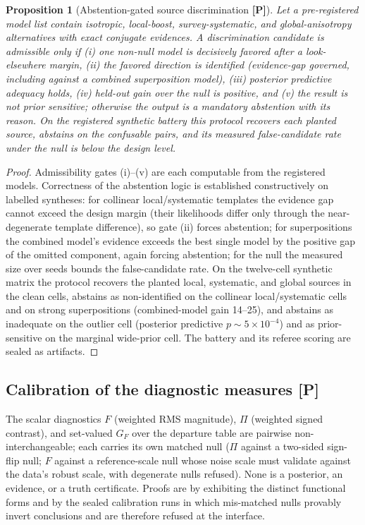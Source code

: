 \documentclass[10pt]{article}
\newtheorem{proposition}[theorem]{Proposition}
\theoremstyle{definition}
\newcommand{\tier}[1]{\textbf{[#1]}}
\begin{document}
\begin{proposition}[Abstention-gated source discrimination \tier{P}]
\label{prop:mix}
Let a pre-registered model list contain isotropic, local-boost,
survey-systematic, and global-anisotropy alternatives with exact
conjugate evidences. A discrimination candidate is admissible only if
(i) one non-null model is decisively favored after a look-elsewhere
margin, (ii) the favored direction is identified (evidence-gap
governed, including against a combined superposition model),
(iii) posterior predictive adequacy holds, (iv) held-out gain over the
null is positive, and (v) the result is not prior sensitive; otherwise
the output is a mandatory abstention with its reason. On the
registered synthetic battery this protocol recovers each planted
source, abstains on the confusable pairs, and its measured false-candidate
rate under the null is below the design level.
\end{proposition}
\begin{proof}
Admissibility gates (i)--(v) are each computable from the registered
models. Correctness of the abstention logic is established
constructively on labelled syntheses: for collinear local/systematic
templates the evidence gap cannot exceed the design margin (their
likelihoods differ only through the near-degenerate template
difference), so gate (ii) forces abstention; for superpositions the
combined model's evidence exceeds the best single model by the
positive gap of the omitted component, again forcing abstention; for
the null the measured size over seeds bounds the false-candidate
rate. On the twelve-cell synthetic matrix the protocol recovers the
planted local, systematic, and global sources in the clean cells,
abstains as non-identified on the collinear local/systematic cells
and on strong superpositions (combined-model gain 14--25), and
abstains as inadequate on the outlier cell (posterior predictive
$p \sim 5\times10^{-4}$) and as prior-sensitive on the marginal
wide-prior cell. The battery and its referee scoring are sealed as
artifacts.
\end{proof}

\subsection{Calibration of the diagnostic measures \tier{P}}

The scalar diagnostics $F$ (weighted RMS magnitude), $\Pi$ (weighted
signed contrast), and set-valued $G_F$ over the departure table are
pairwise non-interchangeable; each carries its own matched null
($\Pi$ against a two-sided sign-flip null; $F$ against a
reference-scale null whose noise scale must validate against the data's
robust scale, with degenerate nulls refused). None is a posterior, an
evidence, or a truth certificate. Proofs are by exhibiting the
distinct functional forms and by the sealed calibration runs in which
mis-matched nulls provably invert conclusions and are therefore
refused at the interface.
\end{document}
